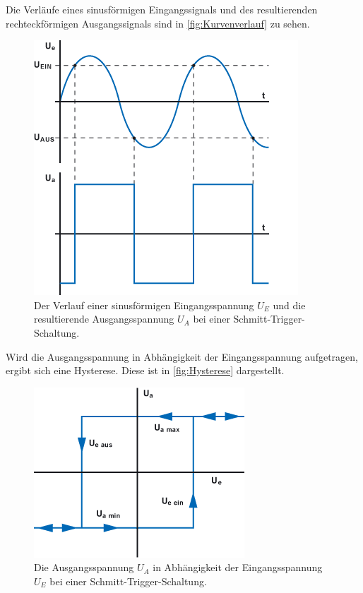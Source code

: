 Die Verläufe eines sinusförmigen Eingangssignals und des resultierenden rechteckförmigen Ausgangssignals sind in \autoref{fig:Kurvenverlauf} zu sehen.

\begin{figure}
    \centering
    \includegraphics[width=0.7\linewidth]{./figures/Kurvenverlauf.png}
    \caption{Der Verlauf einer sinusförmigen Eingangsspannung $U_E$ und die resultierende Ausgangsspannung $U_A$ bei einer Schmitt-Trigger-Schaltung.} %
    \label{fig:Kurvenverlauf}
\end{figure}

Wird die Ausgangsspannung in Abhängigkeit der Eingangsspannung aufgetragen, ergibt sich eine Hysterese. Diese ist in \autoref{fig:Hysterese} dargestellt. %

\begin{figure}
    \centering
    \includegraphics[width=0.7\linewidth]{./figures/Hysterese.png}
    \caption{Die Ausgangsspannung $U_A$ in Abhängigkeit der Eingangsspannung $U_E$ bei einer Schmitt-Trigger-Schaltung.} %
    \label{fig:Hysterese}
\end{figure}

